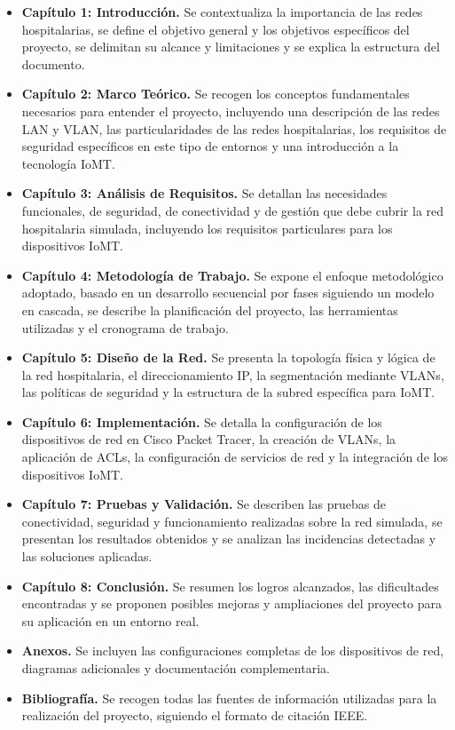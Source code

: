 \begin{itemize}
    \item \textbf{Capítulo 1: Introducción.} Se contextualiza la importancia de las redes hospitalarias, se define el objetivo general y los objetivos específicos del 
    proyecto, se delimitan su alcance y limitaciones y se explica la estructura del documento.
    \item \textbf{Capítulo 2: Marco Teórico.} Se recogen los conceptos fundamentales necesarios para entender el proyecto, incluyendo una descripción de las redes \acs{LAN} y \acs{VLAN}, 
    las particularidades de las redes hospitalarias, los requisitos de seguridad específicos en este tipo de entornos y una introducción a la tecnología \acs{IoMT}.
    \item \textbf{Capítulo 3: Análisis de Requisitos.} Se detallan las necesidades funcionales, de seguridad, de conectividad y de gestión que debe cubrir la red hospitalaria 
    simulada, incluyendo los requisitos particulares para los dispositivos \acs{IoMT}.
    \item \textbf{Capítulo 4: Metodología de Trabajo.} Se expone el enfoque metodológico adoptado, basado en un desarrollo secuencial por fases siguiendo un modelo en cascada, 
    se describe la planificación del proyecto, las herramientas utilizadas y el cronograma de trabajo.
    \item \textbf{Capítulo 5: Diseño de la Red.} Se presenta la topología física y lógica de la red hospitalaria, el direccionamiento \acs{IP}, la segmentación mediante \acs{VLAN}s, las 
    políticas de seguridad y la estructura de la subred específica para \acs{IoMT}.
    \item \textbf{Capítulo 6: Implementación.} Se detalla la configuración de los dispositivos de red en Cisco Packet Tracer, la creación de \acs{VLAN}s, la aplicación de \acs{ACL}s, la 
    configuración de servicios de red y la integración de los dispositivos \acs{IoMT}.
    \item \textbf{Capítulo 7: Pruebas y Validación.} Se describen las pruebas de conectividad, seguridad y funcionamiento realizadas sobre la red simulada, se presentan los 
    resultados obtenidos y se analizan las incidencias detectadas y las soluciones aplicadas.
    \item \textbf{Capítulo 8: Conclusión.} Se resumen los logros alcanzados, las dificultades encontradas y se proponen posibles mejoras y ampliaciones del 
    proyecto para su aplicación en un entorno real.
    \item \textbf{Anexos.} Se incluyen las configuraciones completas de los dispositivos de red, diagramas adicionales y documentación complementaria.
    \item \textbf{Bibliografía.} Se recogen todas las fuentes de información utilizadas para la realización del proyecto, siguiendo el formato de citación \acs{IEEE}.
\end{itemize}